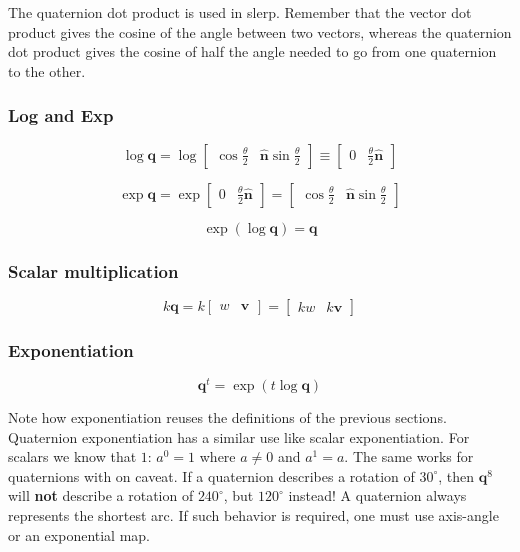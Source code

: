 The quaternion dot product is used in slerp. Remember that the vector dot product gives the cosine of the angle between two vectors, whereas the quaternion dot product gives the cosine of half the angle needed to go from one quaternion to the other.

\subsubsection{Log and Exp}

$$\log\textbf{q}=\log\begin{bmatrix}
\cos\frac{\theta}{2} & \hat{\textbf{n}}\sin\frac{\theta}{2}\end{bmatrix}\equiv
\begin{bmatrix}0 & \frac{\theta}{2}\hat{\textbf{n}}\end{bmatrix}$$

$$\exp\textbf{q}=\exp\begin{bmatrix}0 & \frac{\theta}{2}\hat{\textbf{n}}\end{bmatrix}=
\begin{bmatrix}\cos\frac{\theta}{2} & \hat{\textbf{n}}\sin\frac{\theta}{2}\end{bmatrix}
$$

$$\exp(\log\textbf{q})=\textbf{q}$$

\subsubsection{Scalar multiplication}

$$k\textbf{q}=k\begin{bmatrix}w & \textbf{v}\end{bmatrix}=
\begin{bmatrix}kw & k\textbf{v}\end{bmatrix}$$

\subsubsection{Exponentiation}

$$\textbf{q}^t=\exp(t\log\textbf{q})$$

Note how exponentiation reuses the definitions of the previous sections. Quaternion exponentiation has a similar use like scalar exponentiation. For scalars we know that $1$: $a^0=1$ where $a \neq 0$ and $a^1=a$. The same works for quaternions with on caveat. If a quaternion describes a rotation of $30^\circ$, then $\textbf{q}^8$ will \textbf{not} describe a rotation of $240^\circ$, but $120^\circ$ instead! A quaternion always represents the shortest arc. If such behavior is required, one must use axis-angle or an exponential map.

